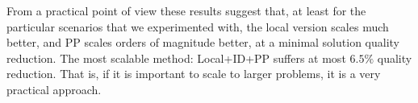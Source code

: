 \documentclass[letterpaper]{article} %
\def\
UrlFont{\rm}  %
\newcommand{\plan}[1]{\textbf{[\color{blue}PLAN:#1]}}
\newcommand{\commentout}[1]{}
\theoremstyle{definition}
\begin{document}
From a practical point of view these results suggest that, at least for the particular scenarios that we experimented with, the local version scales much better, and PP scales orders of magnitude better, at a minimal solution quality reduction. The most scalable method: Local+ID+PP suffers at most $6.5\%$ quality reduction. That is, if it is important to scale to larger problems, it is a very practical approach.



















    
\end{document}
